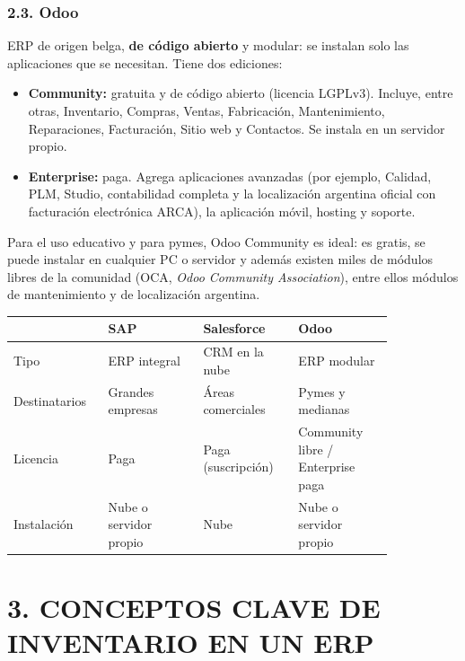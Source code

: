 \subsubsection*{2.3. Odoo}
ERP de origen belga, \textbf{de código abierto} y modular: se instalan solo las aplicaciones
que se necesitan. Tiene dos ediciones:
\begin{itemize}
  \item \textbf{Community:} gratuita y de código abierto (licencia LGPLv3). Incluye, entre
        otras, Inventario, Compras, Ventas, Fabricación, Mantenimiento, Reparaciones,
        Facturación, Sitio web y Contactos. Se instala en un servidor propio.
  \item \textbf{Enterprise:} paga. Agrega aplicaciones avanzadas (por ejemplo, Calidad, PLM,
        Studio, contabilidad completa y la localización argentina oficial con
        facturación electrónica ARCA), la aplicación móvil, hosting y soporte.
\end{itemize}
Para el uso educativo y para pymes, Odoo Community es ideal: es gratis, se puede instalar en
cualquier PC o servidor y además existen miles de módulos libres de la comunidad (OCA,
\textit{Odoo Community Association}), entre ellos módulos de mantenimiento y de localización
argentina.

\begin{center}
\small
\begin{tabular}{|p{0.18\linewidth}|p{0.22\linewidth}|p{0.22\linewidth}|p{0.22\linewidth}|}
\hline
 & \textbf{SAP} & \textbf{Salesforce} & \textbf{Odoo} \\ \hline
Tipo & ERP integral & CRM en la nube & ERP modular \\ \hline
Destinatarios & Grandes empresas & Áreas comerciales & Pymes y medianas \\ \hline
Licencia & Paga & Paga (suscripción) & Community libre / Enterprise paga \\ \hline
Instalación & Nube o servidor propio & Nube & Nube o servidor propio \\ \hline
\end{tabular}
\end{center}

\section*{3. CONCEPTOS CLAVE DE INVENTARIO EN UN ERP}

